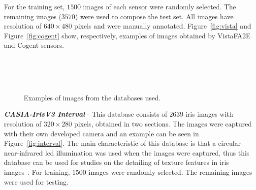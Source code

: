 \documentclass[conference]{IEEEtran}
\begin{document}
For the training set, $1500$ images of each sensor were randomly selected. 
The remaining images ($3570$) were used to compose the test set. 
All images have resolution of $640\times480$ pixels and were manually annotated. 
Figure~\ref{fig:vista} and Figure~\ref{fig:cogent} show, respectively, examples of images obtained by VistaFA2E and Cogent sensors.

\begin{figure}[!htb]
	\vspace{-2.5mm} 
	\centering
	 \,
     \,
	 \\[-1ex]
		
	 \,
     \,
	 \\[-1ex]
		
	 \,
     \,
		
	\caption{Examples of images from the databases used.} 

\label{fig:examplesdatasets} 
\end{figure}


\textit{\textbf{CASIA-IrisV3 Interval}} - This database consists of $2639$ iris images with resolution of $320\times280$ pixels, obtained in two sections. The images were captured with their own developed camera and an example can be seen in Figure~\ref{fig:interval}.
The main characteristic of this database is that a circular near-infrared led illumination was used when the images were captured, thus this database can be used for studies on the detailing of texture features in iris images~\cite{interval}.
For training, $1500$ images were randomly selected. The remaining images were used for testing.
\end{document}
